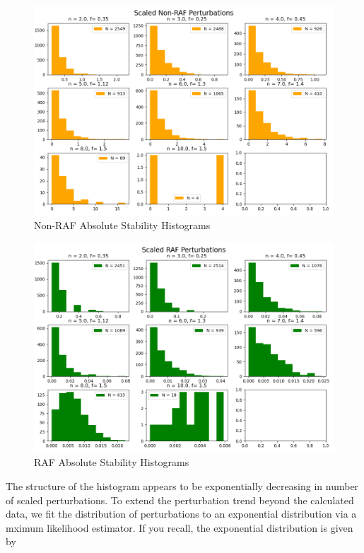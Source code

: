 \documentclass[11pt]{article}
\begin{document}
\begin{figure}[H]
    \centering
    \includegraphics[width=15cm]{Scaled-Non-RAF_Perturbations_Hist.png}
    \caption{Non-RAF Absolute Stability Histograms}
\end{figure}
\begin{figure}[H]
    \centering
    \includegraphics[width=15cm]{Scaled-RAF_Perturbations_Hist.png}
    \caption{RAF Absolute Stability Histograms}
\end{figure}

The structure of the histogram appears to be exponentially decreasing in number of scaled perturbations.
To extend the perturbation trend beyond the calculated data, we fit the distribution of perturbations to an exponential distribution via a mximum likelihood estimator.
If you recall, the exponential distribution is given by 
\end{document}
